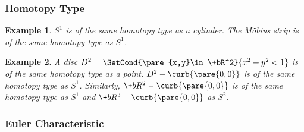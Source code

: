 \documentclass[hidelinks]{article}
\newtheorem{example}{Example}
\begin{document}
\subsubsection{Homotopy Type} %
\label{ssub:homotopy_type}

\begin{sample}
    \begin{example}
        $S^1$ is of the same homotopy type as a cylinder. The M\"obius strip is of the same homotopy type as $S^1$.
    \end{example}
\end{sample}
\begin{sample}
    \begin{example}
        A disc $D^2 = \SetCond{\pare{x,y}\in \+bR^2}{x^2+y^2<1}$ is of the same homotopy type as a point. $D^2 - \curb{\pare{0,0}}$ is of the same homotopy type as $S^1$. Similarly, $\+bR^2 - \curb{\pare{0,0}}$ is of the same homotopy type as $S^1$ and $\+bR^3 - \curb{\pare{0,0}}$ as $S^2$.
    \end{example}
\end{sample}


\subsubsection{Euler Characteristic} %
\label{ssub:euler_characteristic}
\end{document}
